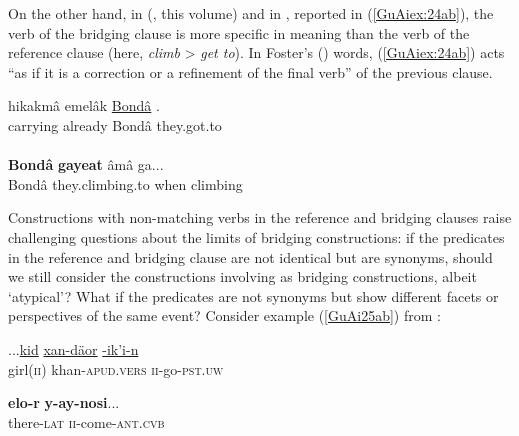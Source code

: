 \documentclass[output=paper]{LSP/langsci}
\begin{document}
On the other hand, in  (\citeauthor{jarkey18}, this volume) and in , reported in (\ref{GuAiex:24ab}), the verb of the bridging clause is more specific in meaning than the verb of the reference clause (here, \textit{climb} > \textit{get to}). In Foster’s (\citeyear{foster81}) words, (\ref{GuAiex:24ab}) acts ``as if it is a correction or a refinement of the final verb'' of the previous clause.


\begin{exe}
\ex \label{GuAiex:24ab}
\begin{xlist}
\ex \label{GuAiex:24a}
\gll hikakmâ   emelâk \underline{Bondâ} \underline{}. \\
carrying   already Bondâ they.got.to\\
\glt {} \\
\ex \label{GuAiex:24b}
\gll  \textbf{Bondâ } \textbf{gayeat}     âmâ   ga...\\
 Bondâ they.climbing.to   when   climbing \\
\glt {}
\end{xlist}
\end{exe}


Constructions with non-matching verbs in the reference and bridging clauses raise challenging questions about the limits of bridging constructions: if the predicates in the reference and bridging clause are not identical but are synonyms, should we still consider the constructions involving  as bridging constructions, albeit `atypical'? What if the predicates are not synonyms but show different facets or perspectives of the same event? Consider example (\ref{GuAi25ab}) from :

\begin{exe}
	\ex	\label{GuAi25ab}
	\begin{xlist}
		\ex	\label{GuAi25a}
		\gll	...\underline{kid}  	\underline{xan-däor}   		\underline{-ik’i-n}\\
			 girl(\textsc{ii}) 	khan-\textsc{apud.vers} 	\textsc{ii}-go-\textsc{pst.uw} \\
		\glt	{}

		\ex	\label{GuAi25b}
		\gll			\textbf{elo-r}    	\textbf{y-ay-nosi}... \\
			there-\textsc{lat}	\textsc{ii}-come-\textsc{ant.cvb} 	  \\
		\glt	{}
	\end{xlist}
\end{exe}
\end{document}
